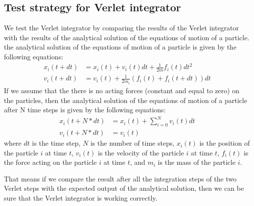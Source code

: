     \subsection{Test strategy for Verlet integrator}
    We test the Verlet integrator by comparing the results of the Verlet integrator with the results of the analytical solution of the equations of motion of a particle. the analytical solution of the equations of motion of a particle is given by the following equations:
    \begin{equation}
    \label{eq:analytical}
        \begin{aligned}
        x_i(t+dt) &= x_i(t) + v_i(t)dt + \frac{1}{2m}f_i(t)dt^2 \\
        v_i(t+dt) &= v_i(t) + \frac{1}{2m_i}(f_i(t)+f_i(t+dt))dt
        \end{aligned}
    \end{equation}
    If we assume that the there is no acting forces (constant and equal to zero) on the particles, then the analytical solution of the equations of motion of a particle after N time steps is given by the following equations:
    \begin{equation}
    \label{eq:analytical2}
        \begin{aligned}
        x_i(t+N*dt) &= x_i(t) + \sum_{i=0}^{N}v_i(t)dt \\
        v_i(t+N*dt) &= v_i(t)
        \end{aligned}
    \end{equation}
    where $dt$ is the time step, $N$ is the number of time steps, $x_i(t)$ is the position of the particle $i$ at time $t$, $v_i(t)$ is the velocity of the particle $i$ at time $t$, $f_i(t)$ is the force acting on the particle $i$ at time $t$, and $m_i$ is the mass of the particle $i$.

    That means if we compare the result after all the integration steps of the two Verlet steps with the expected output of the analytical solution, then we can be sure that the Verlet integrator is working correctly.

